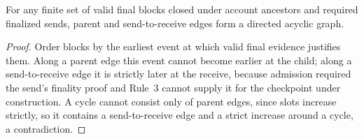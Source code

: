 \documentclass[conference]{IEEEtran}
\begin{document}
\begin{lemma}
\label{lem:dag}
For any finite set of valid final blocks closed under account ancestors and required finalized sends, parent and send-to-receive edges form a directed acyclic graph.
\end{lemma}
\begin{proof}
Order blocks by the earliest event at which valid final evidence justifies them. Along a parent edge this event cannot become earlier at the child; along a send-to-receive edge it is strictly later at the receive, because admission required the send's finality proof and Rule~3 cannot supply it for the checkpoint under construction. A cycle cannot consist only of parent edges, since slots increase strictly, so it contains a send-to-receive edge and a strict increase around a cycle, a contradiction.
\end{proof}
\end{document}
